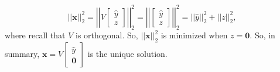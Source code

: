 \documentclass[letterpaper]{article}
\newcommand{\0}{\mathbf{0}}
\newcommand{\x}{\mathbf{x}}
\begin{document}
\[||\x||_2^2 = \left|\left|V \begin{bmatrix}
    \hat{y} \\ z
\end{bmatrix}\right|\right|_2^2 = \left|\left|\begin{bmatrix}
    \hat{y} \\ 
    z
\end{bmatrix}\right|\right|_2^2 = ||\hat{y}||_2^2 + ||z||_2^2,\] where recall that $V$ is orthogonal. So, $||\x||_2^2$ is minimized when $z = \0$. So, in summary, $\boxed{\x = V\begin{bmatrix}
    \hat{y} \\ \0
\end{bmatrix}}$ is the unique solution.

\end{document}
